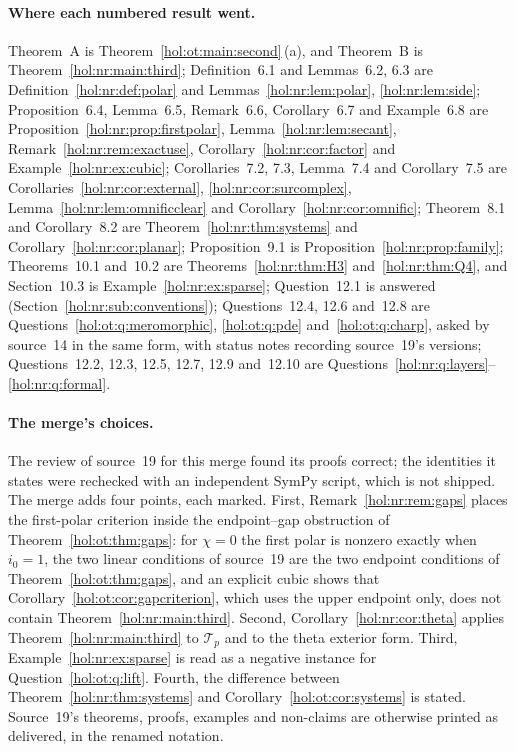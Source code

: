 \documentclass[11pt]{article}
\numberwithin{equation}{section}
\theoremstyle{definition}
\theoremstyle{remark}
\begin{document}
\paragraph{Where each numbered result went.}
Theorem~A is Theorem~\ref{hol:ot:main:second}\,(a), and Theorem~B is
Theorem~\ref{hol:nr:main:third}; Definition~6.1 and Lemmas~6.2, 6.3 are
Definition~\ref{hol:nr:def:polar} and Lemmas~\ref{hol:nr:lem:polar},
\ref{hol:nr:lem:side}; Proposition~6.4, Lemma~6.5, Remark~6.6,
Corollary~6.7 and Example~6.8 are Proposition~\ref{hol:nr:prop:firstpolar},
Lemma~\ref{hol:nr:lem:secant}, Remark~\ref{hol:nr:rem:exactuse},
Corollary~\ref{hol:nr:cor:factor} and Example~\ref{hol:nr:ex:cubic};
Corollaries~7.2, 7.3, Lemma~7.4 and Corollary~7.5 are
Corollaries~\ref{hol:nr:cor:external}, \ref{hol:nr:cor:surcomplex},
Lemma~\ref{hol:nr:lem:omnificclear} and Corollary~\ref{hol:nr:cor:omnific};
Theorem~8.1 and Corollary~8.2 are Theorem~\ref{hol:nr:thm:systems} and
Corollary~\ref{hol:nr:cor:planar}; Proposition~9.1 is
Proposition~\ref{hol:nr:prop:family}; Theorems~10.1 and~10.2 are
Theorems~\ref{hol:nr:thm:H3} and~\ref{hol:nr:thm:Q4}, and Section~10.3 is
Example~\ref{hol:nr:ex:sparse}; Question~12.1 is answered
(Section~\ref{hol:nr:sub:conventions}); Questions~12.4, 12.6 and~12.8 are
Questions~\ref{hol:ot:q:meromorphic}, \ref{hol:ot:q:pde}
and~\ref{hol:ot:q:charp}, asked by source~14 in the same form, with status
notes recording source~19's versions; Questions~12.2, 12.3, 12.5, 12.7, 12.9
and~12.10 are Questions~\ref{hol:nr:q:layers}--\ref{hol:nr:q:formal}.

\paragraph{The merge's choices.}
The review of source~19 for this merge found its proofs correct; the
identities it states were rechecked with an independent SymPy script, which is
not shipped. The merge adds four points, each marked. First,
Remark~\ref{hol:nr:rem:gaps} places the first-polar criterion inside the
endpoint--gap obstruction of Theorem~\ref{hol:ot:thm:gaps}: for $\chi=0$ the
first polar is nonzero exactly when $i_0=1$, the two linear conditions of
source~19 are the two endpoint conditions of Theorem~\ref{hol:ot:thm:gaps},
and an explicit cubic shows that Corollary~\ref{hol:ot:cor:gapcriterion},
which uses the upper endpoint only, does not contain
Theorem~\ref{hol:nr:main:third}. Second, Corollary~\ref{hol:nr:cor:theta}
applies Theorem~\ref{hol:nr:main:third} to $\mathcal T_p$ and to the theta
exterior form. Third, Example~\ref{hol:nr:ex:sparse} is read as a negative
instance for Question~\ref{hol:ot:q:lift}. Fourth, the difference between
Theorem~\ref{hol:nr:thm:systems} and Corollary~\ref{hol:ot:cor:systems} is
stated. Source~19's theorems, proofs, examples and non-claims are otherwise
printed as delivered, in the renamed notation.
\end{document}
